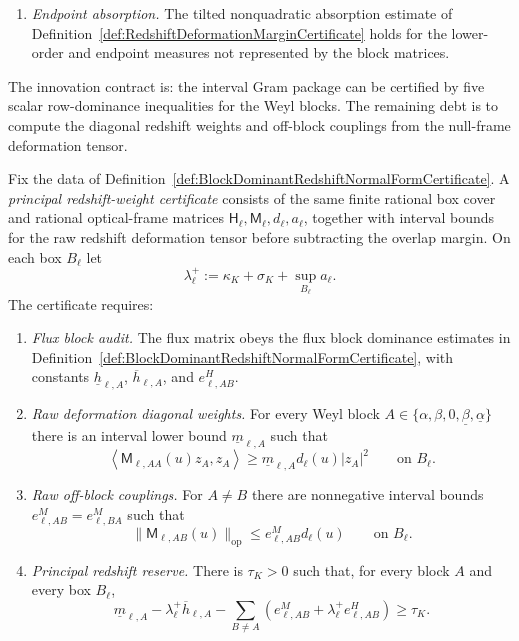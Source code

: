 \begin{definition}
\begin{enumerate}
    \item \emph{Endpoint absorption.}  The tilted nonquadratic absorption estimate
    of Definition~\ref{def:RedshiftDeformationMarginCertificate} holds for the
    lower-order and endpoint measures not represented by the block matrices.
\end{enumerate}
The innovation contract is: the interval Gram package can be certified by
five scalar row-dominance inequalities for the Weyl blocks.  The remaining debt
is to compute the diagonal redshift weights and off-block couplings from the
null-frame deformation tensor.
\end{definition}

\begin{definition}\label{def:PrincipalRedshiftWeightCertificate}
Fix the data of Definition~\ref{def:BlockDominantRedshiftNormalFormCertificate}.
A \emph{principal redshift-weight certificate} consists of the same finite
rational box cover and rational optical-frame matrices
$\mathsf H_\ell,\mathsf M_\ell,d_\ell,a_\ell$, together with interval bounds
for the raw redshift deformation tensor before subtracting the overlap margin.
On each box $B_\ell$ let
\[
    \lambda_\ell^+
    :=
    \kappa_K+\sigma_K+\sup_{B_\ell} a_\ell .
\]
The certificate requires:
\begin{enumerate}
    \item \emph{Flux block audit.}  The flux matrix obeys the flux block
    dominance estimates in
    Definition~\ref{def:BlockDominantRedshiftNormalFormCertificate}, with
    constants $\underline h_{\ell,A}$, $\overline h_{\ell,A}$, and
    $e^H_{\ell,AB}$.

    \item \emph{Raw deformation diagonal weights.}  For every Weyl block
    $A\in\{\alpha,\beta,0,\underline\beta,\underline\alpha\}$ there is an
    interval lower bound $\underline m_{\ell,A}$ such that
    \[
        \left\langle \mathsf M_{\ell,AA}(u)z_A,z_A\right\rangle
        \ge
        \underline m_{\ell,A}d_\ell(u)|z_A|^2
        \qquad\text{on }B_\ell .
    \]

    \item \emph{Raw off-block couplings.}  For $A\ne B$ there are nonnegative
    interval bounds $e^M_{\ell,AB}=e^M_{\ell,BA}$ such that
    \[
        \|\mathsf M_{\ell,AB}(u)\|_{\mathrm{op}}
        \le
        e^M_{\ell,AB}d_\ell(u)
        \qquad\text{on }B_\ell .
    \]

    \item \emph{Principal redshift reserve.}  There is $\tau_K>0$ such that, for
    every block $A$ and every box $B_\ell$,
    \[
        \underline m_{\ell,A}
        -
        \lambda_\ell^+\overline h_{\ell,A}
        -
        \sum_{B\ne A}
        \left(
            e^M_{\ell,AB}
            +
            \lambda_\ell^+ e^H_{\ell,AB}
        \right)
        \ge
        \tau_K .
    \]


\end{enumerate}
\end{definition}

